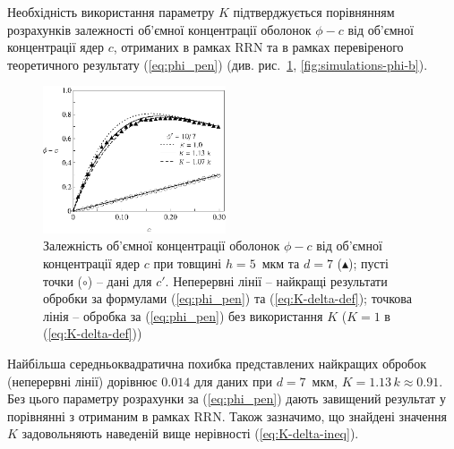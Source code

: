 \documentclass[14pt,twoside]{vakthesis}
\begin{document}
Необхідність використання параметру $K$ підтверджується порівнянням розрахунків залежності об'ємної концентрації оболонок $\phi-c$ від об'ємної концентрації ядер $c$, отриманих в рамках RRN \cite{Siekierski2007} та в рамках перевіреного теоретичного результату (\ref{eq:phi_pen}) (див. рис.~\ref{fig:simulations-phi-a}, \ref{fig:simulations-phi-b}).
\begin{figure}[!ht]
	\centering
		\includegraphics[width=0.48\textwidth]{SiekierskiShell_107.eps}
		\caption{Залежність об'ємної концентрації оболонок $\phi-c$ від об'ємної концентрації ядер $c$ \cite{Siekierski2007} при товщині $h=5$~мкм та $d = 7$ ($\blacktriangle$); пусті точки ($\circ$) -- дані для $c'$. Неперервні лінії -- найкращі результати обробки за формулами (\ref{eq:phi_pen}) та (\ref{eq:K-delta-def}); точкова лінія -- обробка за (\ref{eq:phi_pen}) без використання $K$ ($K=1$ в (\ref{eq:K-delta-def}))} \label{fig:simulations-phi-a}
\end{figure}
{\color{violet} Найбільша середньоквадратична 
похибка представлених найкращих обробок (неперервні лінії) 
дорівнює $0.014$ для даних при $d=7$~мкм, $K=1.13\,k \approx 0.91$.} Без цього параметру розрахунки за (\ref{eq:phi_pen}) дають завищений результат у порівнянні з отриманим в рамках RRN.
Також зазначимо, що знайдені значення $K$ задовольняють наведеній 
вище нерівності (\ref{eq:K-delta-ineq}).
\end{document}
